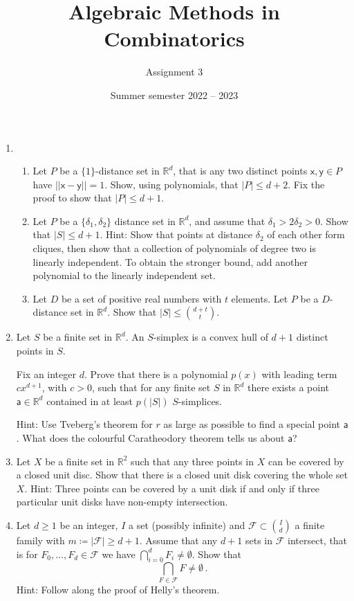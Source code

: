 \documentclass[kulak]{tplt}
\title{Algebraic Methods in Combinatorics}
\author{Assignment 3}
\date{Summer semester 2022 -- 2023}
\theoremstyle{definition}
\newcommand{\R}{\mathbb{R}}
\newcommand{\FF}{\mathcal F}
\newcommand{\vx}{\mathsf{x}}
\newcommand{\vy}{\mathsf{y}}
\newcommand{\va}{\mathsf{a}}
\begin{document}
\maketitle
\begin{enumerate}
\item 

\begin{enumerate}
\item  Let $P$ be a $\{1\}$-distance set in $\R^d$, that is any two distinct points $\vx, \vy \in P $ have $||\vx - \vy || = 1$.
Show, using polynomials, that $|P| \leq d+2$.
Fix the proof to show that $|P| \leq d+1$.

\item Let $P$ be a $\{\delta_1, \delta_2\}$ distance set in $\R^d $, and assume that $\delta_1> 2 \delta_2 > 0$.
Show that $|S| \leq d+1$.
Hint: Show that points at distance $\delta_2$ of each other form cliques, then show that a collection of polynomials of degree two is linearly independent.
To obtain the stronger bound, add another polynomial to the linearly independent set.

\item
Let $D $ be a set of positive real numbers with $t$ elements.
Let $P$ be a $D$-distance set in $\R^d$.
Show that $|S| \leq \binom{d+t}{t}$.

\end{enumerate}

\item Let $S$ be a finite set in $\R^d$.
An $S$-simplex is a convex hull of $d+1$ distinct points in $S$.

Fix an integer $d$.
Prove that there is a polynomial $p(x)$ with leading term $c x^{d+1}$, with $c > 0$, such that for any finite set $S$ in $\R^d$ there exists a point $\va \in \R^d$ contained in at least $p(|S|)$ $S$-simplices.

Hint: Use Tveberg's theorem for $r$ as large as possible to find a special point $\va$.
What does the colourful Caratheodory theorem tells us about $\va$?


\item Let $X$ be a finite set in $\R^2$ such that any three points in $X$ can be covered by a closed unit disc.
Show that there is a closed unit disk covering the whole set $X$.
Hint: Three points can be covered by a unit disk if and only if three particular unit disks have non-empty intersection.


\item 
Let $d\geq 1$ be an integer, $I$ a set (possibly infinite) and $\mathcal F \subset \binom{I}{d}$ a finite family with $m\coloneq |\FF | \geq d+1$.
Assume that any $d+1$ sets in $\FF $ intersect, that is for $F_0, \ldots, F_d \in \FF $ we have $\bigcap_{i=0}^d F_i \neq \emptyset$.
Show that 
$$ \bigcap_{F \in \FF} F \neq \emptyset \, . $$
Hint: 
Follow along the proof of Helly's theorem.


\end{enumerate}
\end{document}
